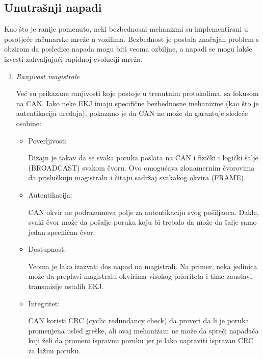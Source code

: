 \documentclass[a4paper]{article}
\begin{document}
\subsection{Unutrašnji napadi}
\label{subsec:napadiunutar}

Kao što je ranije pomenuto, neki bezbednosni mehanizmi su implementirani u posotjeće računarske mreže u vozilima. Bezbednost je postala značajan problem s obzirom da posledice napada mogu biti veoma ozbiljne, a napadi se mogu lakše izvesti zahvaljujući rapidnoj evoluciji mreža. 
\begin{enumerate}
  \item[] \textit{Ranjivost magistrale}
  
  Već su prikazane ranjivosti koje postoje u trenutnim protokolima, sa fokusom na CAN. Iako neke EKJ imaju specifične bezbednosne mehanizme (kao što je autentikacija uređaja), pokazano je da CAN ne može da garantuje sledeće osobine:
  \begin{itemize}
  	\item Poverljivost: 
    
    Dizajn je takav da se svaka poruka poslata na CAN i fizički i logički šalje (BROADCAST) svakom čvoru. Ovo omogućava zlonamernim čvorovima da prisluškuju magistralu i čitaju sadržaj svakakog okvira (FRAME).
    \item Autentikacija:
    
    CAN okvir ne podrazumeva polje za autentikaciju svog pošiljaoca. Dakle, svaki čvor može da pošalje poruku koju bi trebalo da može da šalje samo jedan specifičan čvor.
    
    \item Dostupnost:
    
    Veoma je lako izazvati dos napad na magistrali. Na primer, neka jedinica može da preplavi magistralu okvirima visokog prioriteta i time zaustavi transmisije ostalih EKJ.
    \item Integritet:
    
    CAN koristi CRC (cyclic redundancy check) da proveri da li je poruka promenjena usled greške, ali ovaj mehanizam ne može da spreči napadača koji želi da promeni ispravnu poruku jer je lako napraviti ispravan CRC za lažnu poruku.     
  \end{itemize}

\end{enumerate}






\appendix
 

\end{document}
